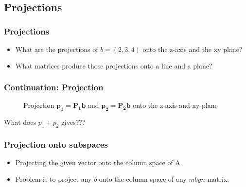 \documentclass{beamer}
\newtheorem{Key points}{Key points}
\begin{document}
\subsection{Projections}
 \begin{frame}
   \frametitle{Projections}
   \begin{itemize}
   \item What are the projections of $b=(2,3,4)$ onto the z-axis and the xy plane?
   \item<2-> What matrices produce those projections onto a line and a plane?
   \end{itemize}

 \end{frame}
 \begin{frame}
   \frametitle{Continuation: Projection}
   \begin{figure}
\centering
{} 
\caption{Projection $\mathbf{p_1=P_1b}$ and $\mathbf{p_2=P_2b}$ onto the z-axis and xy-plane}
\end{figure}
What does $p_1 + p_2$ gives???
 \end{frame}
 \begin{frame}
   \frametitle{Projection onto subspaces}
   \begin{itemize}
   \item    Projecting the given vector onto the column space of A. 
\item<2-> Problem is to project any $b$ onto the column space of any $m by n$ matrix.
   \end{itemize}
 \end{frame}
\end{document}
